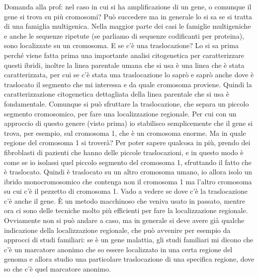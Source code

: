 \documentclass[11pt]{book}
\begin{document}
Domanda alla prof: nel caso in cui si ha amplificazione di un gene, o comunque il gene si trova su più cromosomi?
Può succedere ma in generale lo si sa se si tratta di una famiglia multigenica. Nella maggior parte dei casi le famiglie multigeniche e anche le sequenze ripetute (se parliamo di sequenze codificanti per proteina), sono localizzate su un cromosoma.
E se c’è una traslocazione?
Lo si sa prima perché viene fatta prima una importante analisi citogenetica per caratterizzare questi ibridi, inoltre la linea parentale umana che si usa è una linea che è stata caratterizzata, per cui se c’è stata una traslocazione lo saprò e saprò anche dove è traslocato il segmento che mi interessa e da quale cromosoma proviene. Quindi la caratterizzazione citogenetica dettagliata della linea parentale che si usa è fondamentale.
Comunque si può sfruttare la traslocazione, che separa un piccolo segmento cromosomico, per fare una localizzazione regionale. Per cui con un approccio di questo genere (visto prima) io stabilisco semplicemente che il gene si trova, per esempio, sul cromosoma 1, che è un cromosoma enorme.
Ma in quale regione del cromosoma 1 si troverà? Per poter sapere qualcosa in più, prendo dei fibroblasti di pazienti che hanno delle piccole traslocazioni, e in questo modo è come se io isolassi quel piccolo segmento del cromosoma 1, sfruttando il fatto che è traslocato. Quindi è traslocato su un altro cromosoma umano, io allora isolo un ibrido monocromosomico che contenga non il cromosoma 1 ma l’altro cromosoma su cui c’è il pezzetto di cromosoma 1. Vado a vedere se dove c’è la traslocazione c’è anche il gene. È un metodo macchinoso che veniva usato in passato, mentre ora ci sono delle tecniche molto più efficienti per fare la localizzazione regionale. Ovviamente non si può andare a caso, ma in generale si deve avere già qualche indicazione della localizzazione regionale, che può avvenire per esempio da approcci di studi familiari: se è un gene malattia, gli studi familiari mi dicono che c’è un marcatore anonimo che so essere localizzato in una certa regione del genoma e allora studio una particolare traslocazione di una specifica regione, dove so che c’è quel marcatore anonimo. 
\end{document}

